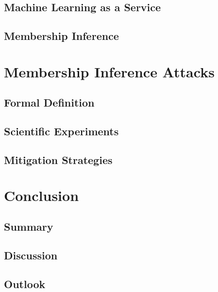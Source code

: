 \documentclass[runningheads]{llncs}
\begin{document}
\subsection{Machine Learning as a Service}
\subsection{Membership Inference}

\section{Membership Inference Attacks}
\subsection{Formal Definition}
\subsection{Scientific Experiments}
\subsection{Mitigation Strategies}

\section{Conclusion}
\subsection{Summary}
\subsection{Discussion}
\subsection{Outlook}



%
%
%
% 
% 
%

\printbibliography
\end{document}
